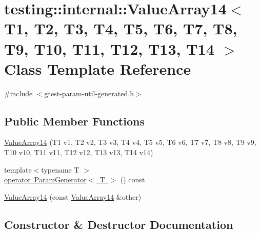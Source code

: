 \hypertarget{classtesting_1_1internal_1_1ValueArray14}{}\section{testing\+::internal\+::Value\+Array14$<$ T1, T2, T3, T4, T5, T6, T7, T8, T9, T10, T11, T12, T13, T14 $>$ Class Template Reference}
\label{classtesting_1_1internal_1_1ValueArray14}


{\ttfamily \#include $<$gtest-\/param-\/util-\/generated.\+h$>$}

\subsection*{Public Member Functions}
\begin{DoxyCompactItemize}
\item 
\mbox{\hyperlink{classtesting_1_1internal_1_1ValueArray14_a07a09d64aba1260d403adc661546ce48}{Value\+Array14}} (T1 v1, T2 v2, T3 v3, T4 v4, T5 v5, T6 v6, T7 v7, T8 v8, T9 v9, T10 v10, T11 v11, T12 v12, T13 v13, T14 v14)
\item 
{\footnotesize template$<$typename T $>$ }\\\mbox{\hyperlink{classtesting_1_1internal_1_1ValueArray14_aef77c9d7520c7313e2af66fd79185698}{operator Param\+Generator$<$ T $>$}} () const
\item 
\mbox{\hyperlink{classtesting_1_1internal_1_1ValueArray14_a41d4f0e6d12c86df58b24992a06300dc}{Value\+Array14}} (const \mbox{\hyperlink{classtesting_1_1internal_1_1ValueArray14}{Value\+Array14}} \&other)
\end{DoxyCompactItemize}


\subsection{Constructor \& Destructor Documentation}
\mbox{\label{classtesting_1_1internal_1_1ValueArray14_a07a09d64aba1260d403adc661546ce48}} 
